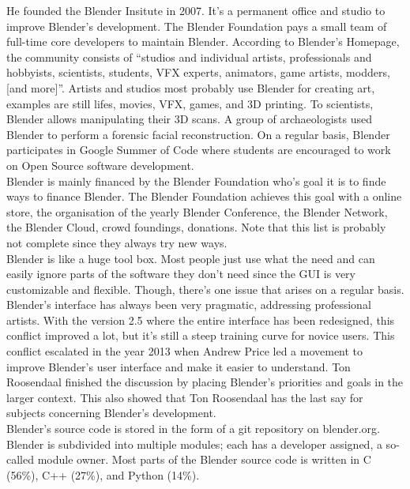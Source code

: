 He founded the Blender Insitute in 2007. 
It's a permanent office and studio to improve Blender's development.\cite{blender-foundation-history}
The Blender Foundation pays a small team of full-time core developers to maintain Blender.\cite{blender-development-support} 
According to Blender's Homepage\cite{blender-homepage}, the community consists of ``studios and individual artists, professionals and hobbyists, scientists, students, VFX experts, animators, game artists, modders, [and more]''.
Artists and studios most probably use Blender for creating art, examples are still lifes, movies, VFX, games, and 3D printing.
To scientists, Blender allows manipulating their 3D scans. 
A group of archaeologists used Blender to perform a forensic facial reconstruction.\cite{blender-facial-reconstruction}
On a regular basis, Blender participates in Google Summer of Code where students are encouraged to work on Open Source software development.\cite{blender-gsoc-2016} \\

Blender is mainly financed by the Blender Foundation who's goal it is to finde ways to finance Blender.
The Blender Foundation achieves this goal with a online store\cite{blender-estore}, the organisation of the yearly Blender Conference\cite{blender-conference}, the Blender Network\cite{blender-network}, the Blender Cloud\cite{blender-cloud}, crowd foundings, donations\cite{blender-donate}.
Note that this list is probably not complete since they always try new ways. 
\\

Blender is like a huge tool box. 
Most people just use what the need and can easily ignore parts of the software they don't need since the GUI is very customizable and flexible. 
Though, there's one issue that arises on a regular basis. 
Blender's interface has always been very pragmatic, addressing professional artists. 
With the version 2.5 where the entire interface has been redesigned, this conflict improved a lot, but it's still a steep training curve for novice users. 
This conflict escalated in the year 2013 when Andrew Price led a movement to improve Blender's user interface and make it easier to understand.\cite{blender-guru-ui} 
Ton Roosendaal finished the discussion by placing Blender's priorities and goals in the larger context.\cite{blender-ton-ui}
This also showed that Ton Roosendaal has the last say for subjects concerning Blender's development. \\

Blender's source code is stored in the form of a git repository on blender.org\cite{blender-repository}.
Blender is subdivided into multiple modules; each has a developer assigned, a so-called module owner.\cite{blender-module-owners}
Most parts of the Blender source code is written in C (56\%), C++ (27\%), and Python (14\%).\cite{blender-code-stat} \\

